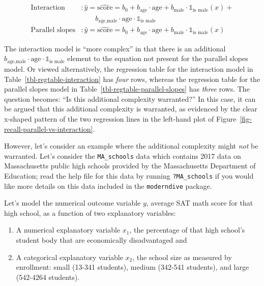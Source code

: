 \documentclass[
  letterpaper,
  DIV=11,
  numbers=noendperiod]{scrreprt}
\providecommand{\tightlist}{%
  \setlength{\itemsep}{0pt}\setlength{\parskip}{0pt}}\usepackage{longtable,booktabs,array}
\theoremstyle{definition}
\theoremstyle{remark}
\begin{document}
\[
\begin{aligned}
\text{Interaction} &: \widehat{y} = \widehat{\text{score}} = b_0 + b_{\mbox{age}} \cdot \mbox{age} + b_{\mbox{male}} \cdot \mathbb{1}_{\mbox{is male}}(x) + \\
& \qquad b_{\mbox{age,male}} \cdot \mbox{age} \cdot \mathbb{1}_{\mbox{is male}}\\
\text{Parallel slopes} &: \widehat{y} = \widehat{\text{score}} = b_0 + b_{\mbox{age}} \cdot \mbox{age} + b_{\mbox{male}} \cdot \mathbb{1}_{\mbox{is male}}(x)
\end{aligned}
\]

The interaction model is ``more complex'' in that there is an additional
\(b_{\mbox{age,male}} \cdot \mbox{age} \cdot \mathbb{1}_{\mbox{is male}}\)
element to the equation not present for the parallel slopes model. Or
viewed alternatively, the regression table for the interaction model in
Table~\ref{tbl-regtable-interaction} has \emph{four} rows, whereas the
regression table for the parallel slopes model in
Table~\ref{tbl-regtable-parallel-slopes} has \emph{three} rows. The
question becomes: ``Is this additional complexity warranted?'' In this
case, it can be argued that this additional complexity is warranted, as
evidenced by the clear x-shaped pattern of the two regression lines in
the left-hand plot of Figure~\ref{fig-recall-parallel-vs-interaction}.

However, let's consider an example where the additional complexity might
\emph{not} be warranted. Let's consider the \texttt{MA\_schools} data
which contains 2017 data on Massachusetts public high schools provided
by the Massachusetts Department of Education; read the help file for
this data by running \texttt{?MA\_schools} if you would like more
details on this data included in the \texttt{moderndive} package.

Let's model the numerical outcome variable \(y\), average SAT math score
for that high school, as a function of two explanatory variables:

\begin{enumerate}
\def\labelenumi{\arabic{enumi}.}
\tightlist
\item
  A numerical explanatory variable \(x_1\), the percentage of that high
  school's student body that are economically disadvantaged and
\item
  A categorical explanatory variable \(x_2\), the school size as
  measured by enrollment: small (13-341 students), medium (342-541
  students), and large (542-4264 students).
\end{enumerate}
\end{document}
